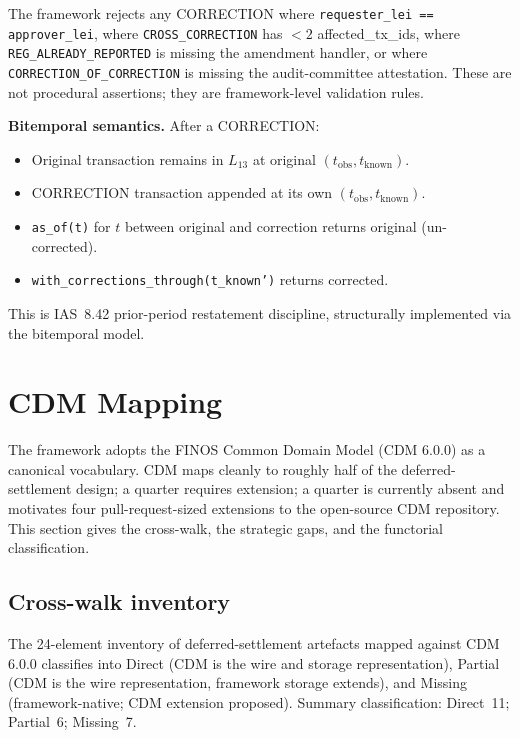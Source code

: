 \documentclass[11pt,a4paper]{article}
\begin{document}
The framework rejects any CORRECTION where \texttt{requester\_lei == approver\_lei}, where \texttt{CROSS\_CORRECTION} has $< 2$ affected\_tx\_ids, where \texttt{REG\_ALREADY\_REPORTED} is missing the amendment handler, or where \texttt{CORRECTION\_OF\_CORRECTION} is missing the audit-committee attestation. These are not procedural assertions; they are framework-level validation rules.

\textbf{Bitemporal semantics.} After a CORRECTION:
\begin{itemize}[nosep]
\item Original transaction remains in $L_{13}$ at original $(t_{\mathrm{obs}}, t_{\mathrm{known}})$.
\item CORRECTION transaction appended at its own $(t_{\mathrm{obs}}, t_{\mathrm{known}})$.
\item \texttt{as\_of(t)} for $t$ between original and correction returns original (un-corrected).
\item \texttt{with\_corrections\_through(t\_known')} returns corrected.
\end{itemize}

This is IAS~8.42 prior-period restatement discipline, structurally implemented via the bitemporal model.

\clearpage
\section{CDM Mapping}
\label{sec:cdm}

The framework adopts the FINOS Common Domain Model (CDM 6.0.0) as a canonical vocabulary. CDM maps cleanly to roughly half of the deferred-settlement design; a quarter requires extension; a quarter is currently absent and motivates four pull-request-sized extensions to the open-source CDM repository. This section gives the cross-walk, the strategic gaps, and the functorial classification.

\subsection{Cross-walk inventory}

The 24-element inventory of deferred-settlement artefacts mapped against CDM 6.0.0 classifies into Direct (CDM is the wire and storage representation), Partial (CDM is the wire representation, framework storage extends), and Missing (framework-native; CDM extension proposed). Summary classification: Direct~11; Partial~6; Missing~7.
\end{document}
